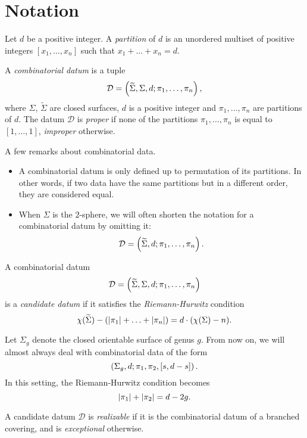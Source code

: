 \documentclass{article}
\begin{document}
\section{Notation}
\begin{definition}
Let $d$ be a positive integer. A \emph{partition} of $d$ is an unordered multiset of positive integers $[x_1,\ldots,x_n]$ such that $x_1+\ldots+x_n=d$.
\end{definition}
\begin{definition}
A \emph{combinatorial datum} is a tuple
\[
\mathcal{D}=\left(\widetilde\Sigma,\Sigma,d;\pi_1,\ldots,\pi_n\right),
\]
where $\Sigma$, $\widetilde\Sigma$ are closed surfaces, $d$ is a positive integer and $\pi_1,\ldots,\pi_n$ are partitions of $d$. The datum $\mathcal{D}$ is \emph{proper} if none of the partitions $\pi_1,\ldots,\pi_n$ is equal to $[1,\ldots,1]$, \emph{improper} otherwise.
\end{definition}

A few remarks about combinatorial data.
\begin{itemize}
\item A combinatorial datum is only defined up to permutation of its partitions. In other words, if two data have the same partitions but in a different order, they are considered equal.
\item When $\Sigma$ is the $2$-sphere, we will often shorten the notation for a combinatorial datum by omitting it:
\[
\mathcal{D}=\left(\widetilde\Sigma,d;\pi_1,\ldots,\pi_n\right).
\]
\end{itemize}

\begin{definition}
A combinatorial datum
\[
\mathcal{D}=\left(\widetilde\Sigma,\Sigma,d;\pi_1,\ldots,\pi_n\right)
\]
is a \emph{candidate datum} if it satisfies the \emph{Riemann-Hurwitz} condition
\[
\chi(\widetilde\Sigma)-\left(\left|\pi_1\right|+\ldots+\left|\pi_n\right|\right)=d\cdot(\chi(\Sigma)-n).
\]
\end{definition}

Let $\Sigma_g$ denote the closed orientable surface of genus $g$. From now on, we will almost always deal with combinatorial data of the form
\[
\left(\Sigma_g,d;\pi_1,\pi_2,[s,d-s]\right).
\]
In this setting, the Riemann-Hurwitz condition becomes
\begin{equation}\label{eq:rh-n3}
\left|\pi_1\right|+\left|\pi_2\right|=d-2g.
\end{equation}

\begin{definition}
A candidate datum $\mathcal{D}$ is \emph{realizable} if it is the combinatorial datum of a branched covering, and is \emph{exceptional} otherwise.
\end{definition}
\end{document}
